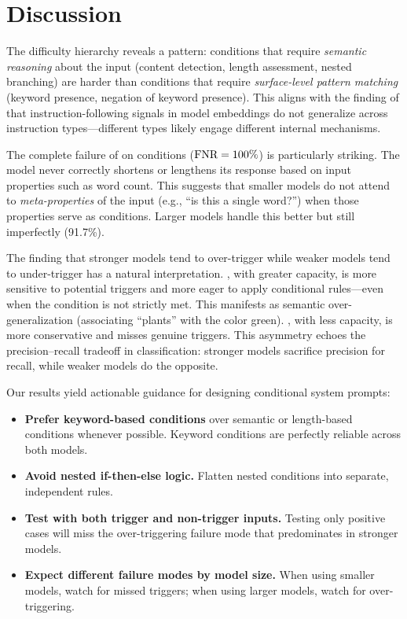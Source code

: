 \section{Discussion}
\label{sec:discussion}

The difficulty hierarchy reveals a pattern: conditions that require \emph{semantic reasoning} about the input (content detection, length assessment, nested branching) are harder than conditions that require \emph{surface-level pattern matching} (keyword presence, negation of keyword presence). This aligns with the finding of \citet{heo2024llms} that instruction-following signals in model embeddings do not generalize across instruction types---different types likely engage different internal mechanisms.

The complete failure of \gptsmall on  conditions ($\text{FNR} = 100\%$) is particularly striking. The model never correctly shortens or lengthens its response based on input properties such as word count. This suggests that smaller models do not attend to \emph{meta-properties} of the input (e.g., ``is this a single word?'') when those properties serve as conditions. Larger models handle this better but still imperfectly (91.7\%).

The finding that stronger models tend to over-trigger while weaker models tend to under-trigger has a natural interpretation. \gptlarge, with greater capacity, is more sensitive to potential triggers and more eager to apply conditional rules---even when the condition is not strictly met. This manifests as semantic over-generalization (\eg associating ``plants'' with the color green). \gptsmall, with less capacity, is more conservative and misses genuine triggers. This asymmetry echoes the precision--recall tradeoff in classification: stronger models sacrifice precision for recall, while weaker models do the opposite.

Our results yield actionable guidance for designing conditional system prompts:
\begin{itemize}[leftmargin=*,itemsep=0pt,topsep=0pt]
    \item \textbf{Prefer keyword-based conditions} over semantic or length-based conditions whenever possible. Keyword conditions are perfectly reliable across both models.
    \item \textbf{Avoid nested if-then-else logic.} Flatten nested conditions into separate, independent rules.
    \item \textbf{Test with both trigger and non-trigger inputs.} Testing only positive cases will miss the over-triggering failure mode that predominates in stronger models.
    \item \textbf{Expect different failure modes by model size.} When using smaller models, watch for missed triggers; when using larger models, watch for over-triggering.
\end{itemize}

